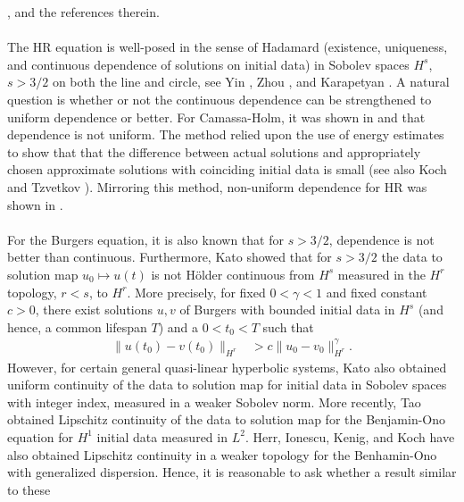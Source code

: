 \documentclass[12pt,reqno]{amsart}
\numberwithin{equation}{section}  %
\numberwithin{figure}{section}
\begin{document}
\cite{Constantin_2000_Stability-of-pe}, and the references therein.
\\
\\
The HR equation is well-posed in the sense of Hadamard (existence, uniqueness,
and continuous dependence of solutions on initial data) in Sobolev spaces
$H^{s}$, $s > 3/2$ on both the line and circle, see Yin
\cite{Yin_2003_On-the-Cauchy-p}, Zhou \cite{Zhou_2005_Local-well-pose}, and
Karapetyan \cite{Karapetyan:2010fk}. A natural question is whether or not the
continuous dependence can be strengthened to uniform dependence or better. For
Camassa-Holm, it was shown in \cite{Himonas:2010p1187} and \cite{Himonas:2009fk}
that dependence is not uniform. The method relied upon the use of energy
estimates to show that that the difference between actual solutions and appropriately chosen approximate solutions with coinciding initial data is small (see
also Koch and Tzvetkov \cite{Koch_2005_Nonlinear-wave-}). Mirroring this method,
non-uniform dependence for HR was shown in \cite{Karapetyan:2010fk}. 
\\
\\
For the Burgers equation, it is also known that for $s > 3/2$, dependence is not
better than continuous. Furthermore, Kato \cite{Kato_1975_Quasi-linear-eq}
showed that for $s > 3/2$ the data to solution map $u_{0} \mapsto u(t)$ is not
H\"older continuous from $H^{s}$ measured in the $H^{r}$ topology, $r < s$, to
$H^{r}$. More precisely, for fixed $0 < \gamma < 1$ and fixed constant $c > 0$,
there exist solutions $u, v$ of Burgers with bounded initial data in $H^{s}$
(and hence, a common lifespan $T$) and a $0 < t_{0} < T$ such that
%
%
\begin{equation*}
\begin{split}
    \| u(t_{0}) - v(t_{0}) \|_{H^{r}} 
  & > c \| u_{0} - v_{0} \|^{\gamma}_{H^{r}}.
\end{split}
\end{equation*}
However, for certain general quasi-linear hyperbolic systems, Kato also obtained
uniform continuity of the data to solution map for initial data in Sobolev
spaces with integer index, measured in a weaker Sobolev norm. More recently, Tao
\cite{Tao:2004p1537} obtained Lipschitz continuity of the data to solution map
for the Benjamin-Ono equation for $H^{1}$ initial data measured in $L^{2}$.
Herr, Ionescu, Kenig, and Koch \cite{Herr:2010p886} have also obtained Lipschitz
continuity in a weaker topology for the Benhamin-Ono with generalized
dispersion. Hence, it is reasonable to ask whether a result similar to these
\end{document}

